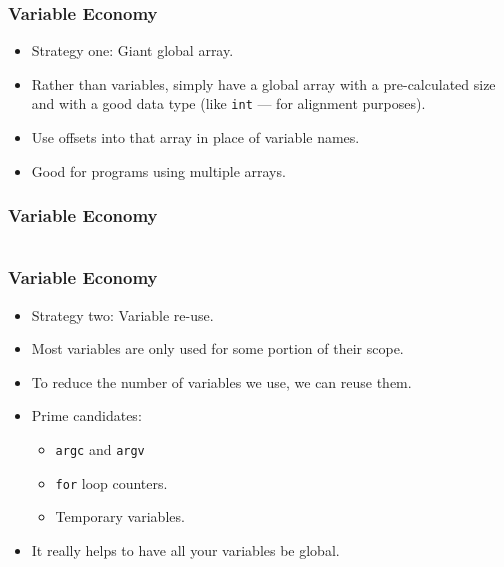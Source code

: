 \documentclass[xcolor]{beamer}
\begin{document}
\begin{frame}
	\frametitle{Variable Economy}
	\pause
	
	\begin{itemize}
		\item Strategy one: \pause Giant global array.
		\pause
		
		\item Rather than variables, simply have a global array with a pre-calculated size and with a good data type \pause (like \texttt{int} --- for alignment purposes).
		\pause
		
		\item Use offsets into that array in place of variable names.
		\pause
		
		\item Good for programs using multiple arrays.
	\end{itemize}
\end{frame}

\begin{frame}
	\frametitle{Variable Economy}
	\pause
	
	\begin{columns}
		\begin{column}{0.45\textwidth}
			\centering
			
		\end{column}
		\pause
		\begin{column}{0.45\textwidth}
			\centering
			
		\end{column}
	\end{columns}
\end{frame}

\begin{frame}
	\frametitle{Variable Economy}
	\pause
	
	\begin{itemize}
		\item Strategy two: \pause Variable re-use.
		\pause
		
		\item Most variables are only used for some portion of their scope.
		\pause
		
		\item To reduce the number of variables we use, we can reuse them.
		\pause
		
		\item Prime candidates:
		\pause
		\begin{itemize}
			\item \texttt{argc} and \texttt{argv}
			\pause
			
			\item \texttt{for} loop counters.
			\pause
			
			\item Temporary variables.
		\end{itemize}
		\pause
		
		\item It really helps to have all your variables be global.
	\end{itemize}
\end{frame}
\end{document}
